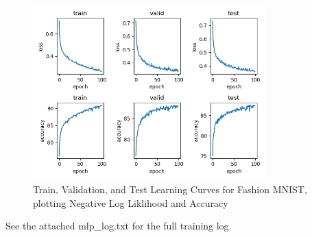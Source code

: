\documentclass[reqno]{amsart}
\theoremstyle{definition}
\theoremstyle{remark}
\numberwithin{equation}{section}
\begin{document}
\begin{figure}[H]
    \centering
    \includegraphics[width=0.8\textwidth]{curves}
    \caption{Train, Validation, and Test Learning Curves for Fashion MNIST, plotting Negative Log Liklihood and Accuracy}
    \label{fig:mnist_learning_curves}
\end{figure}

See the attached mlp\_log.txt for the full training log.
\end{document}
